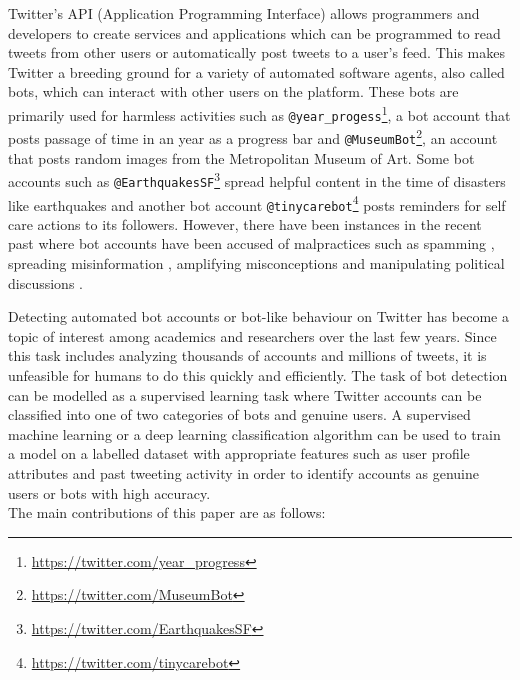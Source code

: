 \documentclass{llncs}
\begin{document}
Twitter's API (Application Programming Interface) allows programmers and developers to create services and applications which can be programmed to read tweets from other users or automatically post tweets to a user's feed. This makes Twitter a breeding ground for a variety of automated software agents, also called bots, which can interact with other users on the platform. These bots are primarily used for harmless activities such as \texttt{@year\_progess}\footnote{\url{https://twitter.com/year_progress}}, a bot account that posts passage of time in an year as a progress bar and \texttt{@MuseumBot}\footnote{\url{https://twitter.com/MuseumBot}}, an account that posts random images from the Metropolitan Museum of Art. Some bot accounts such as \texttt{@EarthquakesSF}\footnote{\url{https://twitter.com/EarthquakesSF}} spread helpful content in the time of disasters like earthquakes and another bot account \texttt{@tinycarebot}\footnote{\url{https://twitter.com/tinycarebot}} posts reminders for self care actions to its followers. However, there have been instances in the recent past where bot accounts have been accused of malpractices such as spamming \cite{lee2011seven}, spreading misinformation \cite{shao2018spread}, amplifying misconceptions \cite{doi:10.2105/AJPH.2018.304567} and manipulating political discussions \cite{FM7090}.

Detecting automated bot accounts or bot-like behaviour on Twitter has become a topic of interest among academics and researchers over the last few years. Since this task includes analyzing thousands of accounts and millions of tweets, it is unfeasible for humans to do this quickly and efficiently. The task of bot detection can be modelled as a supervised learning task where Twitter accounts can be classified into one of two categories of bots and genuine users. A supervised machine learning or a deep learning classification algorithm can be used to train a model on a labelled dataset with appropriate features such as user profile attributes and past tweeting activity in order to identify accounts as genuine users or bots with high accuracy.
\\

The main contributions of this paper are as follows:
\end{document}
